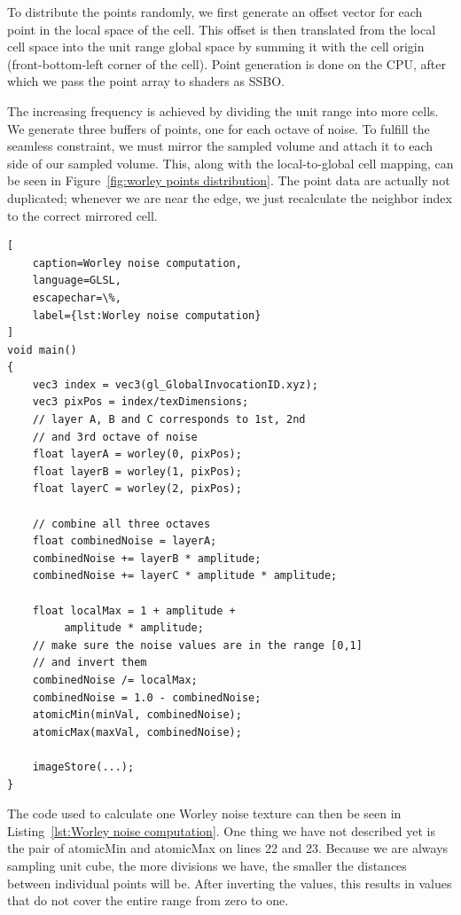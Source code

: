 \documentclass{ctuthesis}
\begin{document}
To distribute the points randomly, we first generate an offset vector for each point in the local space of the cell.
This offset is then translated from the local cell space into the unit range global space by summing it with the
cell origin (front-bottom-left corner of the cell). Point generation is done on the CPU, after which we pass 
the point array to shaders as SSBO.

The increasing frequency is achieved by dividing the unit range into more cells. We generate three 
buffers of points, one for each octave of noise. To fulfill the seamless constraint, we must mirror the 
sampled volume and attach it to each side of our sampled volume. This, along with the local-to-global cell
mapping, can be seen in Figure~\ref{fig:worley points distribution}. The point data are actually not
duplicated; whenever we are near the edge, we just recalculate the neighbor index to the correct mirrored
cell.

\begin{lstlisting}[ 
    caption=Worley noise computation,
    language=GLSL,
    escapechar=\%,
    label={lst:Worley noise computation}
]
void main()
{
    vec3 index = vec3(gl_GlobalInvocationID.xyz);
    vec3 pixPos = index/texDimensions;
    // layer A, B and C corresponds to 1st, 2nd
    // and 3rd octave of noise
    float layerA = worley(0, pixPos);
    float layerB = worley(1, pixPos);
    float layerC = worley(2, pixPos);

    // combine all three octaves 
    float combinedNoise = layerA;
    combinedNoise += layerB * amplitude;
    combinedNoise += layerC * amplitude * amplitude;

    float localMax = 1 + amplitude +
         amplitude * amplitude; 
    // make sure the noise values are in the range [0,1]
    // and invert them
    combinedNoise /= localMax;
    combinedNoise = 1.0 - combinedNoise;
    atomicMin(minVal, combinedNoise);
    atomicMax(maxVal, combinedNoise);

    imageStore(...);
}
\end{lstlisting}

The code used to calculate one Worley noise texture can then be seen in Listing~\ref{lst:Worley noise computation}.
One thing we have not described yet is the pair of atomicMin and atomicMax on lines 22 and 23. Because
we are always sampling unit cube, the more divisions we have, the smaller the distances between individual points
will be. After inverting the values, this results in values that do not cover the entire range from zero to one.
\end{document}

